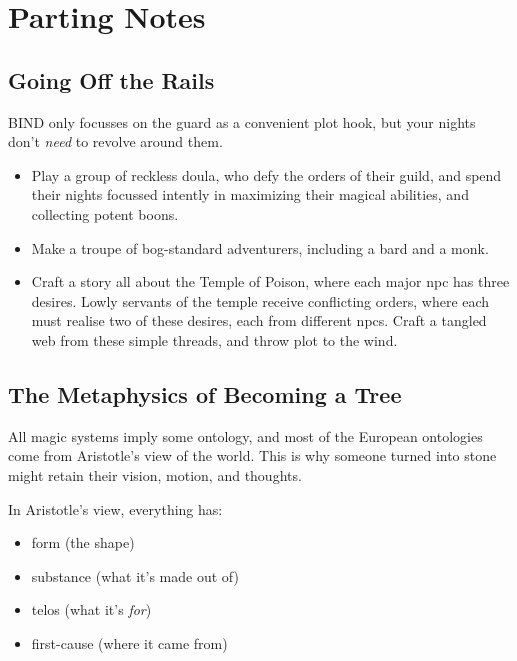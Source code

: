 \section{Parting Notes}

\begin{multicols}{2}

\subsection{Going Off the Rails}

BIND only focusses on the \gls{guard} as a convenient plot hook, but your nights don't \emph{need} to revolve around them.

\begin{itemize}
  \item
  Play a group of reckless doula, who defy the orders of their guild, and spend their nights focussed intently in maximizing their magical abilities, and collecting potent \glspl{boon}.
  \item
  Make a troupe of bog-standard adventurers, including a bard and a monk.
  \item
  Craft a story all about the Temple of Poison, where each major \gls{npc} has three desires.
  Lowly servants of the temple receive conflicting orders, where each must realise two of these desires, each from different \glspl{npc}.
  Craft a tangled web from these simple threads, and throw plot to the wind.
\end{itemize}


\subsection{The Metaphysics of Becoming a Tree}

All magic systems imply some ontology, and most of the European ontologies come from Aristotle's view of the world.
This is why someone turned into stone might retain their vision, motion, and thoughts.

In Aristotle's view, everything has:

\begin{itemize}
  \item
  form (the shape)
  \item
  substance (what it's made out of)
  \item
  telos (what it's \emph{for})
  \item
  first-cause (where it came from)
\end{itemize}


\end{multicols}
